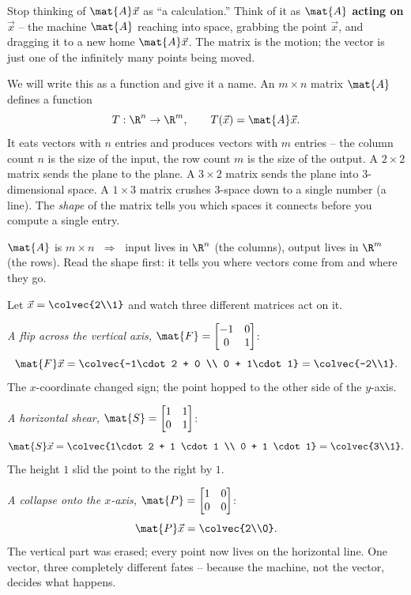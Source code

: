 \begin{intuitionbox}
Stop thinking of $\mat{A}\vec{x}$ as ``a calculation.'' Think of it as
\textbf{$\mat{A}$ acting on $\vec{x}$} -- the machine $\mat{A}$ reaching into
space, grabbing the point $\vec{x}$, and dragging it to a new home
$\mat{A}\vec{x}$. The matrix is the motion; the vector is just one of the
infinitely many points being moved.
\end{intuitionbox}

We will write this as a function and give it a name. An $m \times n$ matrix
$\mat{A}$ defines a function
\[
  T : \R^n \to \R^m, \qquad T(\vec{x}) = \mat{A}\vec{x}.
\]
It eats vectors with $n$ entries and produces vectors with $m$ entries -- the
column count $n$ is the size of the input, the row count $m$ is the size of the
output. A $2\times 2$ matrix sends the plane to the plane. A $3\times 2$ matrix
sends the plane into $3$-dimensional space. A $1\times 3$ matrix crushes
$3$-space down to a single number (a line). The \emph{shape} of the matrix tells
you which spaces it connects before you compute a single entry.

\begin{focusbox}
$\mat{A}$ is $m \times n$ $\;\Longrightarrow\;$ input lives in $\R^n$ (the
columns), output lives in $\R^m$ (the rows). Read the shape first: it tells you
where vectors come from and where they go.
\end{focusbox}

\begin{example}
\label{ch05:three-machines}
Let $\vec{x} = \colvec{2\\1}$ and watch three different matrices act on it.

\emph{A flip across the vertical axis,} $\mat{F} = \begin{bmatrix} -1 & 0 \\ 0 & 1\end{bmatrix}$:
\[
  \mat{F}\vec{x} = \colvec{-1\cdot 2 + 0 \\ 0 + 1\cdot 1} = \colvec{-2\\1}.
\]
The $x$-coordinate changed sign; the point hopped to the other side of the
$y$-axis.

\emph{A horizontal shear,} $\mat{S} = \begin{bmatrix} 1 & 1 \\ 0 & 1\end{bmatrix}$:
\[
  \mat{S}\vec{x} = \colvec{1\cdot 2 + 1 \cdot 1 \\ 0 + 1 \cdot 1} = \colvec{3\\1}.
\]
The height $1$ slid the point to the right by $1$.

\emph{A collapse onto the $x$-axis,} $\mat{P} = \begin{bmatrix} 1 & 0 \\ 0 & 0\end{bmatrix}$:
\[
  \mat{P}\vec{x} = \colvec{2\\0}.
\]
The vertical part was erased; every point now lives on the horizontal line.
One vector, three completely different fates -- because the machine, not the
vector, decides what happens.
\end{example}

